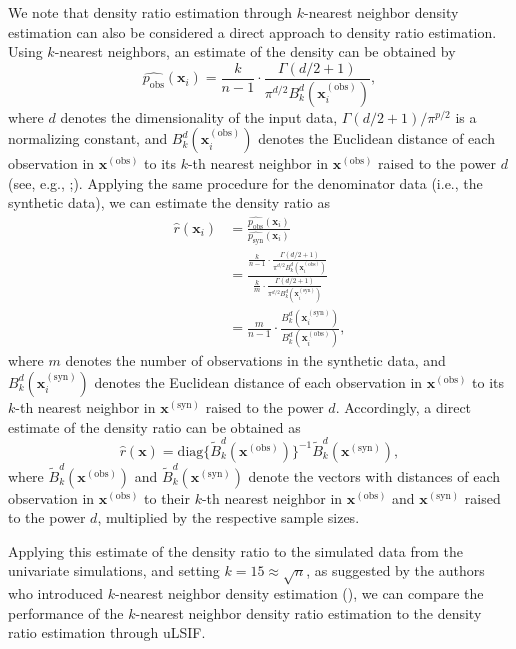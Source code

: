 \documentclass[
]{article}
\newcommand{\pobs}{p_{\text{obs}}}
\newcommand{\psyn}{p_{\text{syn}}}
\newcommand{\bx}{\mathbf{x}}
\begin{document}
We note that density ratio estimation through \(k\)-nearest neighbor
density estimation can also be considered a direct approach to density
ratio estimation. Using \(k\)-nearest neighbors, an estimate of the
density can be obtained by \[
\hat{\pobs}(\bx_i) = \frac{k}{n-1} \cdot \frac{\Gamma(d/2 + 1)}{\pi^{d/2} B^d_k(\bx^{(\text{obs})}_i)},
\] where \(d\) denotes the dimensionality of the input data,
\(\Gamma(d/2 + 1) / \pi^{p/2}\) is a normalizing constant, and
\(B^d_k(\mathbf{x}^{(\text{obs})}_i)\) denotes the Euclidean distance of
each observation in \(\mathbf{x}^{(\text{obs})}\) to its \(k\)-th
nearest neighbor in \(\mathbf{x}^{(\text{obs})}\) raised to the power
\(d\) (see, e.g., ;). Applying the same procedure for the denominator data
(i.e., the synthetic data), we can estimate the density ratio as \[
\begin{aligned}
\hat{r}(\bx_i) &= \frac{\hat{\pobs}(\bx_i)}{\hat{\psyn}(\bx_i)} \\
&= \frac{\frac{k}{n-1} \cdot \frac{\Gamma(d/2 + 1)}{\pi^{d/2} B^d_k(\mathbf{x}^{(\text{obs})}_i)}}{\frac{k}{m} \cdot \frac{\Gamma(d/2 + 1)}{\pi^{d/2} B^d_k(\mathbf{x}^{(\text{syn})}_i)}} \\
&= \frac{m}{n-1} \cdot \frac{B^d_k(\mathbf{x}^{(\text{syn})}_i)}{B^d_k(\mathbf{x}^{(\text{obs})}_i)},
\end{aligned}
\] where \(m\) denotes the number of observations in the synthetic data,
and \(B^d_k(\mathbf{x}^{(\text{syn})}_i)\) denotes the Euclidean
distance of each observation in \(\mathbf{x}^{(\text{obs})}\) to its
\(k\)-th nearest neighbor in \(\mathbf{x}^{(\text{syn})}\) raised to the
power \(d\). Accordingly, a direct estimate of the density ratio can be
obtained as \[
\hat{r}(\bx) = \text{diag}\{\tilde{B}^d_k(\mathbf{x}^{(\text{obs})})\}^{-1} \tilde{B}^d_k(\mathbf{x}^{(\text{syn})}),
\] where \(\tilde{B}^d_k(\mathbf{x}^{(\text{obs})})\) and
\(\tilde{B}^d_k(\mathbf{x}^{(\text{syn})})\) denote the vectors with
distances of each observation in \(\mathbf{x}^{(\text{obs})}\) to their
\(k\)-th nearest neighbor in \(\mathbf{x}^{(\text{obs})}\) and
\(\mathbf{x}^{(\text{syn})}\) raised to the power \(d\), multiplied by
the respective sample sizes.

Applying this estimate of the density ratio to the simulated data from
the univariate simulations, and setting \(k = 15 \approx \sqrt n\), as
suggested by the authors who introduced \(k\)-nearest neighbor density
estimation (), we can compare the performance of the
\(k\)-nearest neighbor density ratio estimation to the density ratio
estimation through uLSIF.
\end{document}
